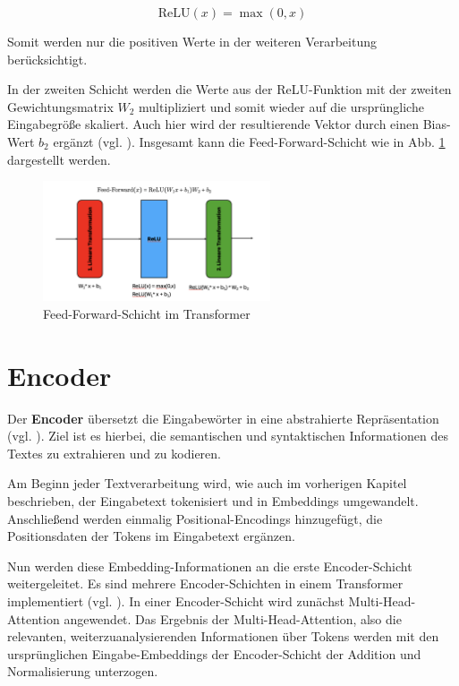\[
\text{ReLU}(x) = \max(0, x)
\]

Somit werden nur die positiven Werte in der weiteren Verarbeitung berücksichtigt.

In der zweiten Schicht werden die Werte aus der ReLU-Funktion mit der zweiten Gewichtungsmatrix \( W_2 \) multipliziert und somit wieder auf die ursprüngliche Eingabegröße skaliert. 
Auch hier wird der resultierende Vektor durch einen Bias-Wert \( b_2 \) ergänzt (vgl. \cite[S. 5]{attention}).
Insgesamt kann die Feed-Forward-Schicht wie in Abb. \ref{fig:relu} dargestellt werden.

\begin{figure}[ht]
	\centering
	\includegraphics[width=0.6\textwidth]{Bilder/RELU.png} 
	\caption{Feed-Forward-Schicht im Transformer}
	\label{fig:relu}
\end{figure}

\section{Encoder}

Der \textbf{Encoder} übersetzt die Eingabewörter in eine abstrahierte Repräsentation (vgl. \cite[S. 3]{attention}).  
Ziel ist es hierbei, die semantischen und syntaktischen Informationen des Textes zu extrahieren und zu kodieren.  

Am Beginn jeder Textverarbeitung wird, wie auch im vorherigen Kapitel beschrieben, der Eingabetext tokenisiert und in Embeddings umgewandelt.
Anschließend werden einmalig Positional-Encodings hinzugefügt, die Positionsdaten der Tokens im Eingabetext ergänzen.

Nun werden diese Embedding-Informationen an die erste Encoder-Schicht weitergeleitet.
Es sind mehrere Encoder-Schichten in einem Transformer implementiert (vgl. \cite[S. 3]{attention}). 
In einer Encoder-Schicht wird zunächst Multi-Head-Attention angewendet.
Das Ergebnis der Multi-Head-Attention, also die relevanten, weiterzuanalysierenden Informationen über Tokens werden mit den ursprünglichen Eingabe-Embeddings der Encoder-Schicht der Addition und Normalisierung unterzogen.

